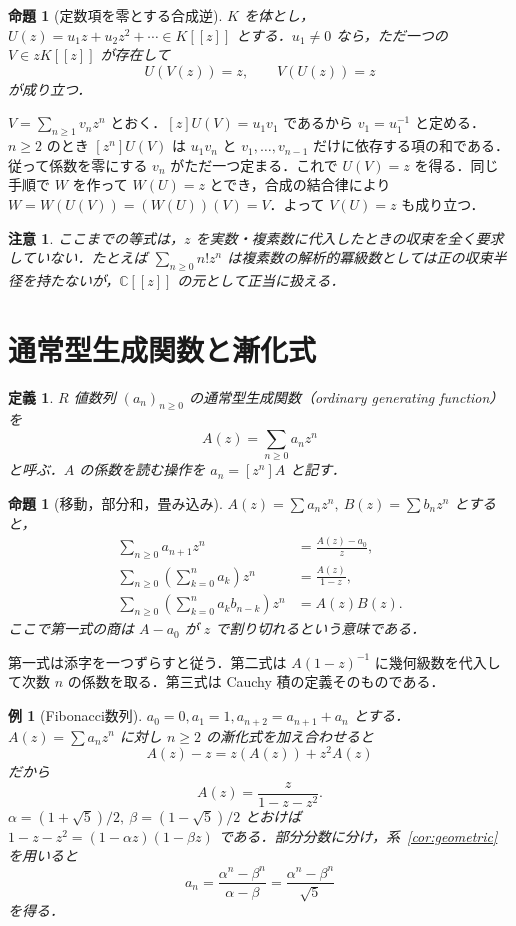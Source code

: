\documentclass[a5paper,10pt,onecolumn]{jsarticle}
\makeatletter
\theoremstyle{mathnotetheorem}
\newtheorem{definition}[theorem]{定義}
\newtheorem{proposition}[theorem]{命題}
\newtheorem{example}[theorem]{例}
\newtheorem{remark}[theorem]{注意}
\renewcommand{\proofname}{証明}
\renewenvironment{proof}[1][\proofname]{%
  \par\pushQED{\qed}\normalfont\topsep4\p@\@plus2\p@\relax
  \trivlist\item[\hskip\labelsep\bfseries #1]\ignorespaces
}{\popQED\endtrivlist\@endpefalse}
\makeatother
\begin{document}
\begin{proposition}[定数項を零とする合成逆]\label{prop:compositional}
$K$ を体とし，$U(z)=u_1z+u_2z^2+\cdots\in K[[z]]$ とする．$u_1\ne0$ なら，ただ一つの $V\in zK[[z]]$ が存在して
\[
 U(V(z))=z,\qquad V(U(z))=z
\]
が成り立つ．
\end{proposition}
\begin{proof}
$V=\sum_{n\ge1}v_nz^n$ とおく．$[z]U(V)=u_1v_1$ であるから $v_1=u_1^{-1}$ と定める．$n\ge2$ のとき $[z^n]U(V)$ は $u_1v_n$ と $v_1,\dots,v_{n-1}$ だけに依存する項の和である．従って係数を零にする $v_n$ がただ一つ定まる．これで $U(V)=z$ を得る．同じ手順で $W$ を作って $W(U)=z$ とでき，合成の結合律により
$W=W(U(V))=(W(U))(V)=V$．よって $V(U)=z$ も成り立つ．
\end{proof}

\begin{remark}
ここまでの等式は，$z$ を実数・複素数に代入したときの収束を全く要求していない．たとえば $\sum_{n\ge0}n!z^n$ は複素数の解析的冪級数としては正の収束半径を持たないが，$\mathbb C[[z]]$ の元として正当に扱える．
\end{remark}

\section{通常型生成関数と漸化式}
\begin{definition}
$R$ 値数列 $(a_n)_{n\ge0}$ の\emph{通常型生成関数}（ordinary generating function）を
\[
 A(z)=\sum_{n\ge0}a_nz^n
\]
と呼ぶ．$A$ の係数を読む操作を $a_n=[z^n]A$ と記す．
\end{definition}
\begin{proposition}[移動，部分和，畳み込み]\label{prop:ogf}
$A(z)=\sum a_nz^n,\ B(z)=\sum b_nz^n$ とすると，
\begin{align*}
 \sum_{n\ge0}a_{n+1}z^n&=\frac{A(z)-a_0}{z},\\
 \sum_{n\ge0}\left(\sum_{k=0}^na_k\right)z^n&=\frac{A(z)}{1-z},\\
 \sum_{n\ge0}\left(\sum_{k=0}^na_kb_{n-k}\right)z^n&=A(z)B(z).
\end{align*}
ここで第一式の商は $A-a_0$ が $z$ で割り切れるという意味である．
\end{proposition}
\begin{proof}
第一式は添字を一つずらすと従う．第二式は $A(1-z)^{-1}$ に幾何級数を代入して次数 $n$ の係数を取る．第三式は Cauchy 積の定義そのものである．
\end{proof}

\begin{example}[Fibonacci数列]
$a_0=0,a_1=1,a_{n+2}=a_{n+1}+a_n$ とする．
$A(z)=\sum a_nz^n$ に対し $n\ge2$ の漸化式を加え合わせると
\[
 A(z)-z=z(A(z))+z^2A(z)
\]
だから
\[
 A(z)=\frac{z}{1-z-z^2}.
\]
$\alpha=(1+\sqrt5)/2,\ \beta=(1-\sqrt5)/2$ とおけば
$1-z-z^2=(1-\alpha z)(1-\beta z)$ である．部分分数に分け，系~\ref{cor:geometric} を用いると
\[
 a_n=\frac{\alpha^n-\beta^n}{\alpha-\beta}
 =\frac{\alpha^n-\beta^n}{\sqrt5}
\]
を得る．
\end{example}
\end{document}
